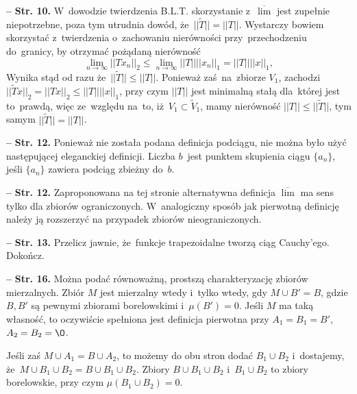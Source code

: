 \documentclass[a4paper,11pt]{article}
\newcommand{\spaceFour}{0.5em}
\newcommand{\ol}{\overline}
\newcommand{\wt}{\widetilde}
\newcommand{\ra}{\rightarrow}
\newcommand{\wtw}{wtedy i~tylko wtedy}
\newcommand{\Lim}{\lim\limits}
\newcommand{\Limsup}{\ol{\lim}}
\newcommand{\norm}[1]{\left|\left| #1 \right|\right|}
\newcommand{\tb}{\textbf}
\newcommand{\noi}{\noindent}
\newcommand{\start}{\noi \tb{--} {}}
\newcommand{\Str}[1]{\tb{Str. #1.}}
\newcommand{\Dok}{{\color{red} Dokończ.}}
\begin{document}
\start \Str{10} W~dowodzie twierdzenia B.L.T. skorzystanie z~$\Limsup$
jest zupełnie niepotrzebne, poza tym utrudnia dowód,
że~$|| \tilde{ T } || = \norm{ T }$. Wystarczy bowiem skorzystać
z~twierdzenia o~zachowaniu nierówności przy~przechodzeniu do~granicy,
by otrzymać pożądaną nierówność
\begin{equation*}
  \Lim_{ n \ra \infty } \norm{ T x_{ n } }_{ 2 }
  \leq \Lim_{ n \ra \infty } \norm{ T } \norm{ x_{ n } }_{ 1 }
  = \norm{ T } \norm{ x }_{ 1 },
\end{equation*}
Wynika stąd od razu że~$|| \wt{ T } || \leq \norm{ T }$. Ponieważ
zaś~na~zbiorze $V_{ 1 }$, zachodzi
$|| \wt{ T } x ||_{ 2 } = \norm{ T x }_{ 2 } \leq \norm{ T } \norm{ x
}_{ 1 }$, przy czym $\norm{ T }$ jest minimalną stałą dla~której jest
to~prawdą, więc ze~względu na~to, iż~$V_{ 1 } \subset \wt{ V }_{ 1 }$,
mamy nierówność $\norm{ T } \leq || \wt{ T } ||$, tym samym
$|| \wt{ T } || = \norm{ T }$. %

\vspace{\spaceFour}


\start \Str{12} Ponieważ nie została podana definicja podciągu, nie
można było użyć następującej eleganckiej definicji. Liczba $b$~jest
punktem skupienia ciągu $\{ a_{ n } \}$, jeśli $\{ a_{ n } \}$ zawiera
podciąg zbieżny do~$b$. %

\vspace{\spaceFour}


\start \Str{12} Zaproponowana na tej stronie alternatywna definicja
$\Limsup$ ma sens tylko dla zbiorów ograniczonych. W~analogiczny
sposób jak pierwotną definicję należy ją rozszerzyć na przypadek
zbiorów nieograniczonych. %

\vspace{\spaceFour}


\start \Str{13} Przelicz jawnie, że~funkcje trapezoidalne tworzą ciąg
Cauchy'ego. \Dok

\vspace{\spaceFour}


\start \Str{16} Można podać równoważną, prostszą charakteryzację
zbiorów mierzalnych. Zbiór $M$ jest mierzalny \wtw, gdy
$M \cup B' = B$, gdzie $B, B'$ są pewnymi zbiorami borelowskimi
i~$\mu( B' ) = 0$. Jeśli $M$ ma taką własność, to oczywiście spełniona
jest definicja pierwotna przy $A_{ 1 } = B_{ 1 } = B'$,
$A_{ 2 } = B_{ 2 } = \O$.

Jeśli zaś $M \cup A_{ 1 } = B \cup A_{ 2 }$, to możemy do obu stron
dodać $B_{ 1 } \cup B_{ 2 }$ i~dostajemy,
że~$M \cup B_{ 1 } \cup B_{ 2 } = B \cup B_{ 1 } \cup B_{ 2 }$. Zbiory
$B \cup B_{ 1 } \cup B_{ 2 }$ i~$B_{ 1 } \cup B_{ 2 }$ to zbiory
borelowskie, przy czym $\mu( B_{ 1 } \cup B_{ 2 } ) = 0$.
\end{document}
